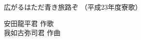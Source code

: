 \documentclass[10pt,b5j]{tarticle} %
\begin{document}
\begin{minipage}[c]{0.7\hsize} %
    \begin{center}
        {\LARGE
            広がるはただ青き旅路ぞ %
        }
        {\small 
            （平成23年度寮歌） %
        }
    \end{center}
\end{minipage}
\begin{minipage}[c]{0.3\hsize} %
    \begin{flushright} %
        安田龍平君 作歌\\我如古弥司君 作曲 %
    \end{flushright}
\end{minipage}
\end{document}
